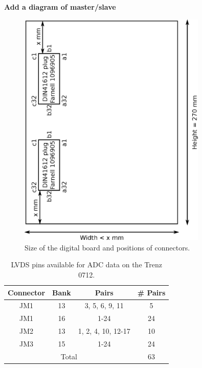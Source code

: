 \documentclass[a4paper]{article}
\begin{document}
{\bf Add a diagram of master/slave}

\begin{figure}[h]
    \begin{center}
        \includegraphics[width=0.8\textwidth]{imgs/digitalboardsize}
        \caption{Size of the digital board and positions of connectors.}
        \label{fig:digitalboardsize}
    \end{center}
\end{figure}


\begin{table}[h]
    \begin{center}
        \caption{LVDS pins available for ADC data on the Trenz 0712.}
        \label{tab:TrenzLVDS}
        \begin{tabular}{cccc}
            \hline
            \hline
            Connector & Bank & Pairs & \# Pairs \\
            \hline
            JM1 & 13 & 3, 5, 6, 9, 11 & 5 \\
            JM1 & 16 & 1-24 & 24 \\
            JM2 & 13 & 1, 2, 4, 10, 12-17 & 10 \\
            JM3 &  15 & 1-24 & 24 \\
            \hline
            \multicolumn{3}{c}{Total} & 63 \\
            \hline
            \hline
        \end{tabular}
    \end{center}
\end{table}
\end{document}
